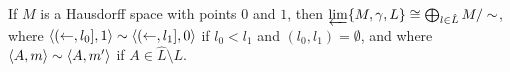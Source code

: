 \documentclass[11pt]{article}
\renewcommand{\cl}{\textrm{cl}}
\newcommand{\lexTimes}{\times_{\textrm{lex}}}
\newcommand{\vect}{\vec}
\begin{document}
  \begin{theorem}
    If \(M\) is a Hausdorff space with points \(0\) and \(1\),
    then \(\varprojlim\{M,\gamma,L\}\cong \bigoplus_{l\in \hat L} M/\sim\),
    where \(\langle(\leftarrow,l_0],1\rangle\sim\langle(\leftarrow,l_1],0\rangle\) if
    \(l_0<l_1\) and \((l_0,l_1)=\emptyset\),
    and where \(\langle A,m\rangle\sim\langle A,m'\rangle\) if \(A\in\hat L\setminus L\).
  \end{theorem}




\end{document}
